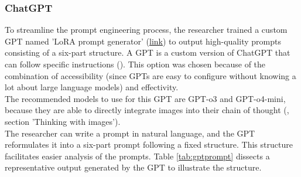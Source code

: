\subsubsection{ChatGPT} \label{sec:ChatGPT}
To streamline the prompt engineering process, the researcher trained a custom GPT named 'LoRA prompt generator' (\href{https://chatgpt.com/g/g-68279d68896c81918191491b79281abe-lora-prompt-generator}{link}) to output high-quality prompts consisting of a six-part structure. A GPT is a custom version of ChatGPT that can follow specific instructions (\cite{openai_introducing_2023}). This option was chosen because of the combination of accessibility (since GPTs are easy to configure without knowing a lot about large language models) and effectivity.\\
The recommended models to use for this GPT are GPT-o3 and GPT-o4-mini, because they are able to directly integrate images into their chain of thought (\cite{openai_introducing_2025}, section 'Thinking with images').\\
The researcher can write a prompt in natural language, and the GPT reformulates it into a six-part prompt following a fixed structure. This structure facilitates easier analysis of the prompts. Table \ref{tab:gptprompt} dissects a representative output generated by the GPT to illustrate the structure. \\

